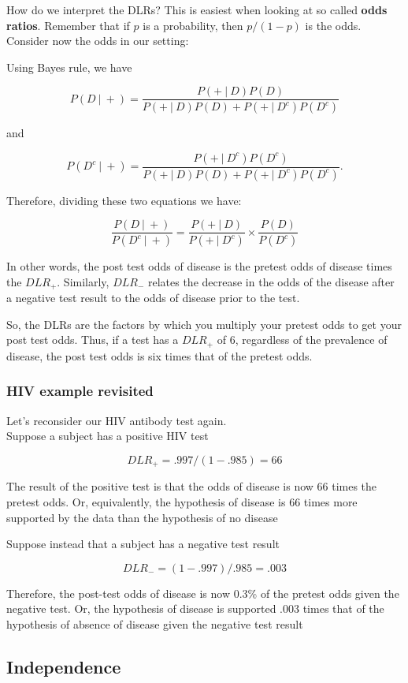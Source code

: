 \documentclass[]{article}
\begin{document}
How do we interpret the DLRs? This is easiest when looking at so called
\textbf{odds ratios}. Remember that if $p$ is a probability, then
$p / (1 - p)$ is the odds. Consider now the odds in our setting:

Using Bayes rule, we have

\[
P(D ~|~ +) = \frac{P(+~|~D)P(D)}{P(+~|~D)P(D) + P(+~|~D^c)P(D^c)}
\]

and

\[
P(D^c ~|~ +) = \frac{P(+~|~D^c)P(D^c)}{P(+~|~D)P(D) + P(+~|~D^c)P(D^c)}.
\]

Therefore, dividing these two equations we have:

\[
\frac{P(D ~|~ +)}{P(D^c ~|~ +)} = \frac{P(+~|~D)}{P(+~|~D^c)}\times \frac{P(D)}{P(D^c)}
\]

In other words, the post test odds of disease is the pretest odds of
disease times the $DLR_+$. Similarly, $DLR_-$ relates the decrease in
the odds of the disease after a negative test result to the odds of
disease prior to the test.

So, the DLRs are the factors by which you multiply your pretest odds to
get your post test odds. Thus, if a test has a $DLR_+$ of 6, regardless
of the prevalence of disease, the post test odds is six times that of
the pretest odds.

\subsubsection{HIV example revisited}\label{hiv-example-revisited}

Let's reconsider our HIV antibody test again.\\Suppose a subject has a
positive HIV test

\[DLR_+ = .997 / (1 - .985) = 66\]

The result of the positive test is that the odds of disease is now 66
times the pretest odds. Or, equivalently, the hypothesis of disease is
66 times more supported by the data than the hypothesis of no disease

Suppose instead that a subject has a negative test result

\[DLR_- = (1 - .997) / .985  =.003\]

Therefore, the post-test odds of disease is now 0.3\% of the pretest
odds given the negative test. Or, the hypothesis of disease is supported
$.003$ times that of the hypothesis of absence of disease given the
negative test result

\subsection{Independence}\label{independence}
\end{document}
